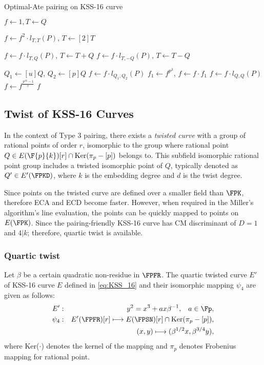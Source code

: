 \begin{algorithm}[H]
	\caption{Optimal-Ate pairing on KSS-16 curve}
	\label{optimal_algo}
	\DontPrintSemicolon

	\hspace{-3ex}
\hspace{-3ex}
	
	\nl $f \leftarrow 1,T \leftarrow Q$\;
	\nl {} {
	\nl $f\leftarrow f^2\cdot l_{T,T}(P)$, $T\leftarrow [2]T$\;

	\nl {} {
	\nl $f\leftarrow f\cdot l_{T,Q}(P)$, $T\leftarrow T+Q$}
    \nl {} {
	\nl $f\leftarrow f\cdot l_{T,-Q}(P)$, $T\leftarrow T-Q$}}
  
	\nl $Q_1\leftarrow [u]Q$, $Q_2\leftarrow [p]Q$\;
	\nl $f\leftarrow f\cdot l_{Q_1,Q_2}(P)$\;
	\nl $f_1\leftarrow f^{p^3}$, $f\leftarrow f\cdot f_1$\;
	\nl $f\leftarrow f\cdot l_{Q,Q}(P)$\;
	\nl $f\leftarrow f^{\frac{p^{16}-1}{r}}$\;
	 $f$\;
\end{algorithm}
\vspace{-0.6em}


\subsection{Twist of KSS-16 Curves} 
In the context of  Type 3 pairing, there exists a \textit{twisted curve} with a group of rational points of order $r$, isomorphic to the group where rational point $Q \in  E(\F{p}{k}) [r] \cap \text{Ker}(\pi_p - [p])$  belongs to. This subfield isomorphic rational point group includes a twisted isomorphic point of $Q$, typically denoted as $Q' \in E'(\FPKD)$, where $k$ is the embedding degree and $d$ is the twist degree.  

Since points on the twisted curve are defined over a smaller field than $\FPK$, therefore ECA and ECD become faster. 
However, when required in the Miller's algorithm's line evaluation, the points can be quickly mapped to points on $E(\FPK )$. 
Since the pairing-friendly KSS-16 \cite{EPRINT:KacSchSco07} curve has CM discriminant of $D = 1$ and $4|k$; therefore, quartic twist is available.
\subsubsection{Quartic twist} \label{Quartic_twist}
Let $\beta$ be a certain quadratic non-residue in $\FPFR$.  The quartic twisted curve $E'$ of KSS-16  curve $E$ defined in \eqref{eq:KSS_16} and  their isomorphic mapping $\psi_4$ are given as follows:
\begin{eqnarray}
	E'&:&y^2=x^3+ax\beta^{-1},\;\;\;a\in\Fp, \nonumber\\
	\psi_4&:&E'(\FPFR)[r] \longmapsto E(\FPSN)[r]\cap {\rm Ker}(\pi_p-[p]),\nonumber\\
	&&(x,y)\longmapsto (\beta^{1/2}x,\beta^{3/4}y),\label{map1}
\end{eqnarray}
where Ker($\cdot$) denotes the kernel of the mapping and $\pi_p$ denotes Frobenius mapping  for rational point.

